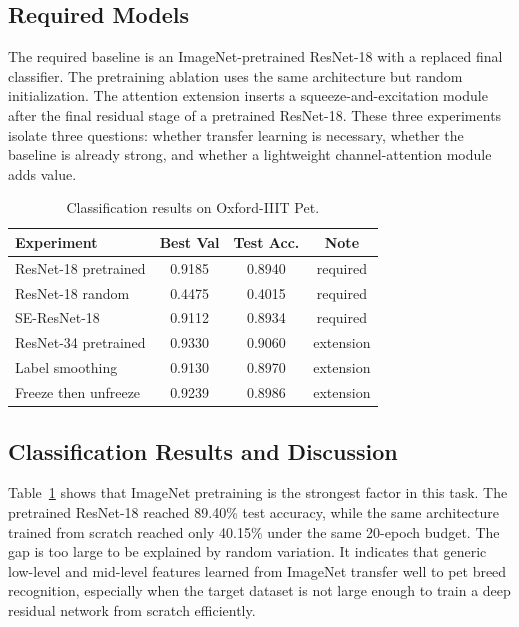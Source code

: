 \documentclass[10pt,twocolumn]{article}
\begin{document}
\subsection{Required Models}

The required baseline is an ImageNet-pretrained ResNet-18 with a replaced final classifier. The pretraining ablation uses the same architecture but random initialization. The attention extension inserts a squeeze-and-excitation module after the final residual stage of a pretrained ResNet-18. These three experiments isolate three questions: whether transfer learning is necessary, whether the baseline is already strong, and whether a lightweight channel-attention module adds value.

\begin{table}[H]
\centering
\caption{Classification results on Oxford-IIIT Pet.}
\label{tab:classification}
\small
\begin{tabular}{lccc}
\toprule
Experiment & Best Val & Test Acc. & Note\\
\midrule
ResNet-18 pretrained & 0.9185 & 0.8940 & required\\
ResNet-18 random & 0.4475 & 0.4015 & required\\
SE-ResNet-18 & 0.9112 & 0.8934 & required\\
ResNet-34 pretrained & 0.9330 & 0.9060 & extension\\
Label smoothing & 0.9130 & 0.8970 & extension\\
Freeze then unfreeze & 0.9239 & 0.8986 & extension\\
\bottomrule
\end{tabular}
\end{table}

\subsection{Classification Results and Discussion}

Table~\ref{tab:classification} shows that ImageNet pretraining is the strongest factor in this task. The pretrained ResNet-18 reached 89.40\% test accuracy, while the same architecture trained from scratch reached only 40.15\% under the same 20-epoch budget. The gap is too large to be explained by random variation. It indicates that generic low-level and mid-level features learned from ImageNet transfer well to pet breed recognition, especially when the target dataset is not large enough to train a deep residual network from scratch efficiently.
\end{document}
